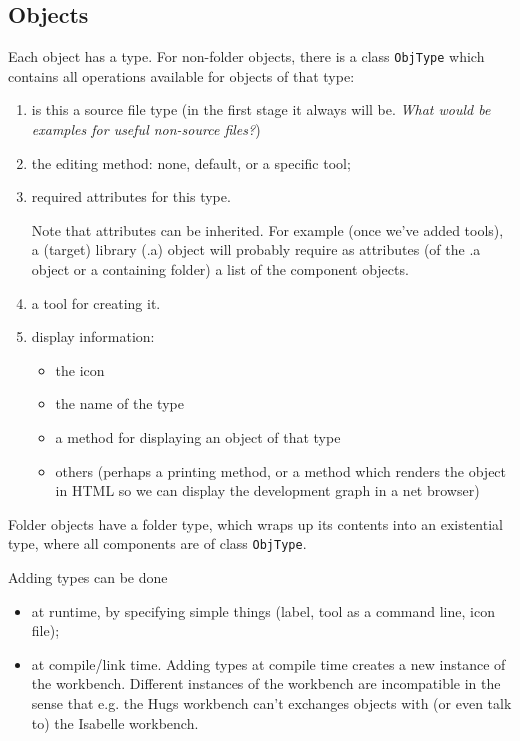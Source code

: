 \documentclass[a4paper]{article}
\begin{document}

\subsection{Objects}

Each object has a type. For non-folder objects, there is a class
\texttt{ObjType} which contains all operations available for objects
of that type:

\begin{enumerate}
\item is this a source file type (in the first stage it always will
  be. \emph{What would be examples for useful non-source files?})
\item the editing method: none, default, or a specific tool;
\item required attributes for this type. 
  
  Note that attributes can be inherited.  For example (once we've
  added tools), a (target) library (.a) object will probably require
  as attributes (of the .a object or a containing folder) a list of
  the component objects.
\item a tool for creating it.
\item display information:
  \begin{itemize}
  \item the icon
  \item the name of the type
  \item a method for displaying an object of that type
  \item others (perhaps a printing method, or a method which renders
    the object in HTML so we can display the development graph in a
    net browser)
  \end{itemize}
\end{enumerate}

Folder objects have a folder type, which wraps up its contents into an
existential type, where all components are of class \texttt{ObjType}.

Adding types can be done 
\begin{itemize}
\item at runtime, by specifying simple things (label, tool as a
  command line, icon file);
\item at compile/link time. Adding types at compile time creates a new
  instance of the workbench. Different instances of the workbench are
  incompatible in the sense that e.g. the Hugs workbench can't
  exchanges objects with (or even talk to) the Isabelle workbench.
\end{itemize}
\end{document}
